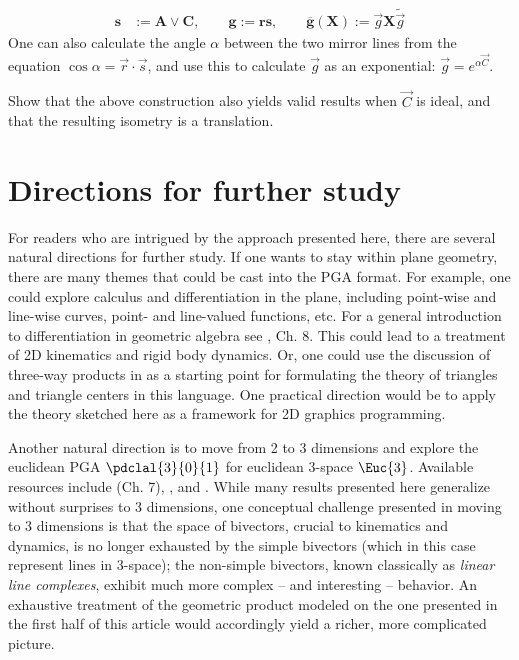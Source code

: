 \documentclass{birkjour}
\newcommand{\mydogblue}{{\color{gray} $\square$~~}}
\begin{document}
\begin{align*}
\mathbf{s} &:= \mathbf{A} \vee \mathbf{C}, \qquad %
\mathbf{g} := \mathbf{r}  \mathbf{s}, \qquad%
\overline{\mathbf{g}}(\mathbf{X})  := \vec{g} \mathbf{X} \widetilde{\vec{g}}  %
 \end{align*}
 One can also calculate the angle $\alpha$ between the two mirror lines from the equation $\cos{{\alpha}} = \vec{r} \cdot \vec{s}$, and use this to calculate $\vec{g}$ as an exponential: $\vec{g} = e^{\alpha \vec{C}}$. %

\myexercise  Show that the above construction also yields valid results when $\vec{C}$ is ideal, and that the resulting isometry is a translation. %
 
% 

\section{Directions for further study}
\label{sec:neg}

\def\MN{metric-neutral\xspace}

For readers who are intrigued by the approach presented here, there are several natural directions for further study.  If one wants to stay within plane geometry, there are many themes that could be cast into the PGA format. For example,  one could explore calculus and differentiation in the plane, including point-wise and line-wise curves, point- and line-valued functions, etc.  For a general introduction to differentiation in geometric algebra see \cite{dfm07}, Ch. 8.  This could lead to a treatment of 2D kinematics and rigid body dynamics.  Or, one could use the discussion of three-way products in  as a starting point for formulating the theory of triangles and triangle centers in this language.  One practical direction would be to apply the theory sketched here as a framework for 2D graphics programming.

Another natural direction  is to move from 2 to 3 dimensions and explore the euclidean PGA $\pdclal{3}{0}{1}$ for euclidean 3-space $\Euc{3}$. Available resources include \cite{gunnThesis} (Ch. 7), \cite{gunn2011}, and \cite{gunnFull2010}.  While many results presented here generalize without surprises to 3 dimensions, one conceptual challenge presented in moving to 3 dimensions is that the space of bivectors, crucial to kinematics and dynamics, is no longer exhausted by the simple bivectors (which in this case represent lines in 3-space); the non-simple bivectors, known classically as \emph{linear line complexes}, exhibit much more complex -- and interesting -- behavior. An exhaustive treatment of the geometric product modeled on the one presented in the first half of this article would accordingly yield a richer, more complicated picture.
\end{document}
